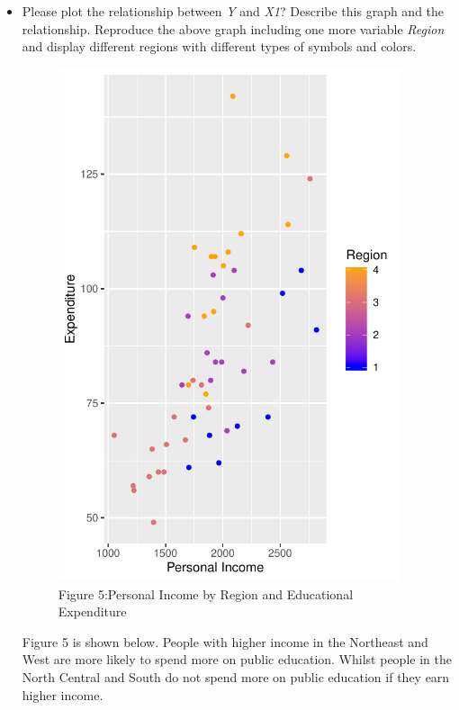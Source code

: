 \documentclass[12pt,letterpaper]{article}
\begin{document}
\begin{itemize}
		\item
		Please plot the relationship between \emph{Y} and \emph{X1}? Describe this graph and the relationship. Reproduce the above graph including one more variable \emph{Region} and display different regions with different types of symbols and colors.
		\vspace{.5cm}
		  
		\vspace{.5cm}
	       \begin{figure}\centering
	       	\caption{Figure 5:Personal Income by Region and Educational Expenditure}
	       	\includegraphics[width=0.95\textwidth]{Rplot5.pdf}
            \end{figure}	
		Figure 5 is shown below. People with higher income in the Northeast and West are more likely to spend more on public education.
		Whilst people in the North Central and South do not spend more on public education if they earn higher income. 
		
	\end{itemize}
	
\end{document}
